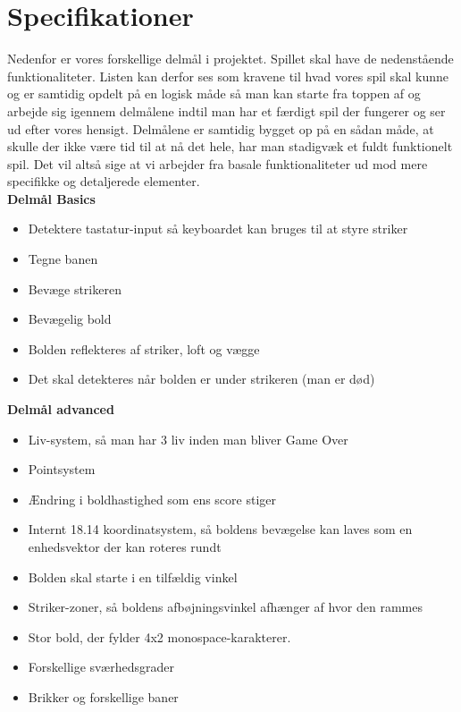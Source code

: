 \chapter{Specifikationer}

Nedenfor er vores forskellige delmål i projektet. Spillet skal have de nedenstående funktionaliteter. Listen kan derfor ses som kravene til hvad vores spil skal kunne og er samtidig opdelt på en logisk måde så man kan starte fra toppen af og arbejde sig igennem delmålene indtil man har et færdigt spil der fungerer og ser ud efter vores hensigt. Delmålene er samtidig bygget op på en sådan måde, at skulle der ikke være tid til at nå det hele, har man stadigvæk et fuldt funktionelt spil. Det vil altså sige at vi arbejder fra basale funktionaliteter ud mod mere specifikke og detaljerede elementer.\\

\textbf{Delmål Basics}
\begin{itemize}
\item Detektere tastatur-input så keyboardet kan bruges til at styre striker
\item Tegne banen
\item Bevæge strikeren
\item Bevægelig bold
\item Bolden reflekteres af striker, loft og vægge
\item Det skal detekteres når bolden er under strikeren (man er død)
\end{itemize}

\textbf{Delmål advanced}
\begin{itemize}
\item Liv-system, så man har 3 liv inden man bliver Game Over
\item Pointsystem
\item Ændring i boldhastighed som ens score stiger
\item Internt 18.14 koordinatsystem, så boldens bevægelse kan laves som en enhedsvektor der kan roteres rundt
\item Bolden skal starte i en tilfældig vinkel
\item Striker-zoner, så boldens afbøjningsvinkel afhænger af hvor den rammes 
\item Stor bold, der fylder 4x2 monospace-karakterer.
\item {Forskellige sværhedsgrader}
\item {Brikker og forskellige baner}
\end{itemize}
	

